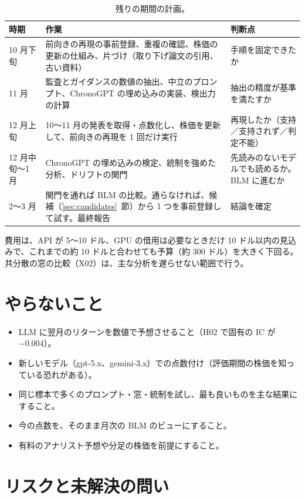 \documentclass[xelatex,ja=standard,jafont=haranoaji,a4paper,10pt]{bxjsreport}
\newcommand{\secref}[1]{\ref{#1}~節}
\begin{document}
\begin{table}[H]
\centering
\caption{残りの期間の計画。}
\small
\begin{tabular}{p{2.4cm}p{6.6cm}p{4.6cm}}
\toprule
時期 & 作業 & 判断点 \\
\midrule
10 月下旬 & 前向きの再現の事前登録、重複の確認、株価の更新の仕組み、片づけ（取り下げ論文の引用、古い資料） & 手順を固定できたか \\
11 月 & 監査とガイダンスの数値の抽出、中立のプロンプト、ChronoGPT の埋め込みの実装、検出力の計算 & 抽出の精度が基準を満たすか \\
12 月上旬 & 10〜11 月の発表を取得・点数化し、株価を更新して、前向きの再現を 1 回だけ実行 & 再現したか（支持／支持されず／判定不能） \\
12 月中旬〜1 月 & ChronoGPT の埋め込みの検定、統制を強めた分析、ドリフトの関門 & 先読みのないモデルでも読めるか。BLM に進むか \\
2〜3 月 & 関門を通れば BLM の比較。通らなければ、候補（\secref{sec:candidates}）から 1 つを事前登録して試す。最終報告 & 結論を確定 \\
\bottomrule
\end{tabular}
\end{table}

費用は、API が 5〜10 ドル、GPU の借用は必要なときだけ 10 ドル以内の見込みで、これまでの約 10 ドルと合わせても予算（約 300 ドル）を大きく下回る。共分散の窓の比較（X02）は、主な分析を遅らせない範囲で行う。

\section{やらないこと}

\begin{itemize}
\item LLM に翌月のリターンを数値で予想させること（H02 で固有の IC が $-0.004$）。
\item 新しいモデル（gpt-5.x、gemini-3.x）での点数付け（評価期間の株価を知っている恐れがある）。
\item 同じ標本で多くのプロンプト・窓・統制を試し、最も良いものを主な結果にすること。
\item 今の点数を、そのまま月次の BLM のビューにすること。
\item 有料のアナリスト予想や分足の株価を前提にすること。
\end{itemize}

\section{リスクと未解決の問い}
\end{document}
